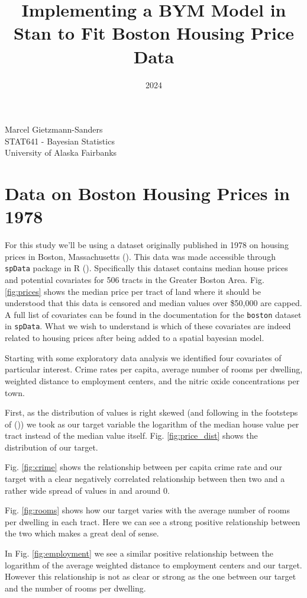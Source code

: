 \documentclass[11pt]{article}
\title{Implementing a BYM Model in Stan to Fit Boston Housing Price Data}
\date{2024}
\makeatletter
\newcommand{\code}[1]{\colorbox{light-gray}{\texttt{#1}}}
\renewcommand{\maketitle}{
\begin{center}

\pagestyle{empty}

{\Large \bf \@title\par}
\vspace{1cm}

{\LARGE Marcel Gietzmann-Sanders}\\[1cm]

STAT641 - Bayesian Statistics \\
University of Alaska Fairbanks


\end{center}
}\makeatother
\makeatother
\begin{document}
\maketitle

\section{Data on Boston Housing Prices in 1978}

For this study we'll be using a dataset originally published in 1978 on housing prices in Boston, Massachusetts (\cite{origin}). This data was made accessible through \code{spData} package in R (\cite{spdata}). Specifically this dataset contains median house prices and potential covariates for 506 tracts in the Greater Boston Area. Fig. \ref{fig:prices} shows the median price per tract of land where it should be understood that this data is censored and median values over \$50,000 are capped. A full list of covariates can be found in the documentation for the \code{boston} dataset in \code{spData}. What we wish to understand is which of these covariates are indeed related to housing prices after being added to a spatial bayesian model. \newline



Starting with some exploratory data analysis we identified four covariates of particular interest. Crime rates per capita, average number of rooms per dwelling, weighted distance to employment centers, and the nitric oxide concentrations per town. 

First, as the distribution of values is right skewed (and following in the footsteps of (\cite{book})) we took as our target variable the logarithm of the median house value per tract instead of the median value itself. Fig. \ref{fig:price_dist} shows the distribution of our target. 



Fig. \ref{fig:crime} shows the relationship between per capita crime rate and our target with a clear negatively correlated relationship between then two and a rather wide spread of values in and around 0. 

Fig. \ref{fig:rooms} shows how our target varies with the average number of rooms per dwelling in each tract. Here we can see a strong positive relationship between the two which makes a great deal of sense. 

In Fig. \ref{fig:employment} we see a similar positive relationship between the logarithm of the average weighted distance to employment centers and our target. However this relationship is not as clear or strong as the one between our target and the number of rooms per dwelling. 
\end{document}
